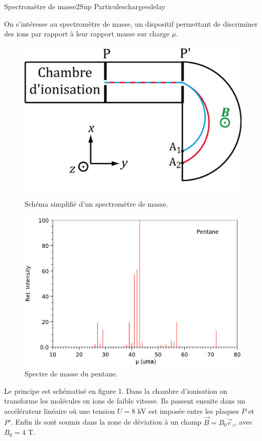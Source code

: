 \begin{exercise}{Spectromètre de masse}{2}{Sup}
{Particuleschargees}{lelay}

On s'intéresse au spectromètre de masse, un dispositif permettant de discriminer des ions par rapport à leur rapport masse sur charge $\mu$.

\begin{multicols}{2}
\begin{figure}[H]
    \centering
    \includegraphics[width=.8\linewidth]{meca/particuleschargees/spectromasse.png}
    \caption{Schéma simplifié d'un spectromètre de masse.}
\end{figure}
\begin{figure}[H]
    \centering
    \includegraphics[width=\linewidth]{meca/particuleschargees/mass_pentane.png}
    \caption{Spectre de masse du pentane.}
\end{figure}
\end{multicols}

Le principe est schématisé en figure 1. Dans la chambre d'ionisation on transforme les molécules en ions de faible vitesse. Ils passent ensuite dans un accélérateur linéaire où une tension $U = 8$ kV est imposée entre les plaques $P$ et $P'$. Enfin ils sont soumis dans la zone de déviation à un champ $\vec{B} = B_0\vec{e}_z$, avec $B_0 = 4$ T.


\end{exercise}
